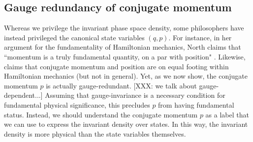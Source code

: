 \documentclass[letterpaper]{article}
\begin{document}


\subsection{Gauge redundancy of conjugate momentum}
\label{gauge_momentum}


Whereas we privilege the invariant phase space density, some philosophers have instead privileged the canonical state variables $(q, p)$. For instance, in her argument for the fundamentality of Hamiltonian mechanics, North claims that ``momentum is a truly fundamental quantity, on a par with position" \parencites*[77]{North}. Likewise, \textcites[164,171]{Wallace} claims that conjugate momentum and position are on equal footing within Hamiltonian mechanics (but not in general). Yet, as we now show, the conjugate momentum $p$ is actually gauge-redundant. [XXX: we talk about gauge-dependent...] Assuming that gauge-invariance is a necessary condition for fundamental physical significance, this precludes $p$ from having fundamental status. Instead, we should understand the conjugate momentum $p$ as a label that we can use to express the invariant density over states. In this way, the invariant density is more physical than the state variables themselves. 
\end{document}
